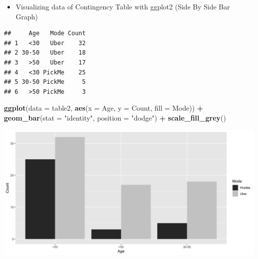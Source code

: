 \documentclass[]{book}
\newenvironment{Shaded}{\begin{snugshade}}{\end{snugshade}}
\newcommand{\DataTypeTok}[1]{\textcolor[rgb]{0.13,0.29,0.53}{#1}}
\newcommand{\KeywordTok}[1]{\textcolor[rgb]{0.13,0.29,0.53}{\textbf{#1}}}
\newcommand{\NormalTok}[1]{#1}
\newcommand{\OperatorTok}[1]{\textcolor[rgb]{0.81,0.36,0.00}{\textbf{#1}}}
\newcommand{\StringTok}[1]{\textcolor[rgb]{0.31,0.60,0.02}{#1}}
\providecommand{\tightlist}{%
  \setlength{\itemsep}{0pt}\setlength{\parskip}{0pt}}
\begin{document}
\begin{itemize}
\tightlist
\item
  Visualizing data of Contingency Table with ggplot2 (Side By Side Bar Graph)
\end{itemize}

\begin{Shaded}
\end{Shaded}

\begin{verbatim}
##     Age   Mode Count
## 1   <30   Uber    32
## 2 30-50   Uber    18
## 3   >50   Uber    17
## 4   <30 PickMe    25
## 5 30-50 PickMe     5
## 6   >50 PickMe     3
\end{verbatim}

\begin{Shaded}
\begin{Highlighting}[]
\KeywordTok{ggplot}\NormalTok{(}\DataTypeTok{data =}\NormalTok{ table2, }\KeywordTok{aes}\NormalTok{(}\DataTypeTok{x =}\NormalTok{ Age, }\DataTypeTok{y =}\NormalTok{ Count, }\DataTypeTok{fill =}\NormalTok{ Mode)) }\OperatorTok{+}\StringTok{ }
\StringTok{  }\KeywordTok{geom_bar}\NormalTok{(}\DataTypeTok{stat =} \StringTok{"identity"}\NormalTok{, }\DataTypeTok{position =} \StringTok{"dodge"}\NormalTok{) }\OperatorTok{+}
\StringTok{  }\KeywordTok{scale_fill_grey}\NormalTok{()}
\end{Highlighting}
\end{Shaded}

\begin{center}\includegraphics{figure/unnamed-chunk-10-1} \end{center}
\end{document}
